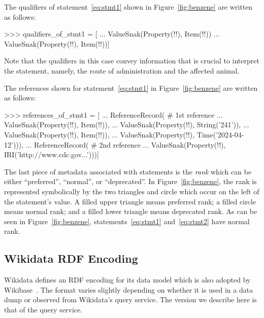 The qualifiers of statement~\eqref{eq:stmt1} shown in Figure~\ref{fig:benzene} are written as follows:
\begin{pyconcode}
>>> qualifiers_of_stmt1 = [
...    ValueSnak(Property(!!), Item(!!))
...    ValueSnak(Property(!!), Item(!!))]
\end{pyconcode}
Note that the qualifiers in this case convey information that is crucial to interpret the statement, namely, the route of administration and the affected animal.


The references shown for statement~\eqref{eq:stmt1} in Figure~\ref{fig:benzene} are written as follows:
\begin{pyconcode}
>>> references_of_stmt1 = [
... ReferenceRecord(    # 1st reference
...    ValueSnak(Property(!!), Item(!!)),
...    ValueSnak(Property(!!), String('241')),
...    ValueSnak(Property(!!), Item(!!)),
...    ValueSnak(Property(!!), Time('2024-04-12'))),
... ReferenceRecord(    # 2nd reference
...    ValueSnak(Property(!!), IRI('http://www.cdc.gov...')))]
\end{pyconcode}





The last piece of metadata associated with statements is the \emph{rank} which can be either ``preferred'', ``normal'', or ``deprecated''.
In Figure~\ref{fig:benzene}, the rank is represented symbolically by the two triangles and circle which occur on the left of the statement's value.
A filled upper triangle means preferred rank; a filled circle means normal rank; and a filled lower triangle means deprecated rank.
As can be seen in Figure~\ref{fig:benzene}, statements~\eqref{eq:stmt1} and~\eqref{eq:stmt2} have normal rank.


\subsection{Wikidata RDF Encoding}%
\label{sec:background:rdf}


Wikidata defines an RDF encoding for its data model which is also adopted by Wikibase~\cite{Wikibase-RDF-Dump-Format,Westerinen-A-2024}.
The format varies slightly depending on whether it is used in a data dump or observed from Wikidata's query service.
The version we describe here is that of the query service.


